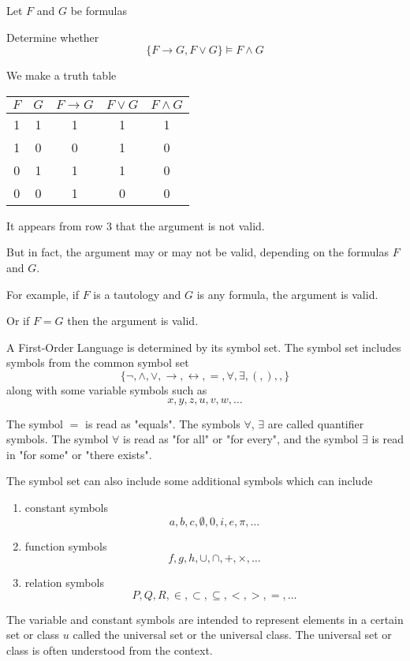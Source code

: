 
\begin{exmp}

Let $F$ and $G$ be formulas 

Determine whether $$\{F\to G, F\vee G\}\vDash F\wedge G$$

\end{exmp}

\begin{solution}
We make a truth table
\begin{center}
\begin{tabular}{c|c|c|c|c}
    $F$ & $G$ & $F\to G$ & $F\vee G$ & $F\wedge G$ \\ \hline
    1 & 1 & 1 & 1 & 1 \\\hline
    1 & 0 & 0 & 1 & 0 \\\hline
    0 & 1 & 1 & 1 & 0 \\\hline
    0 & 0 & 1 & 0 & 0 \\
\end{tabular}
\end{center}

\end{solution}

\begin{rem}

It appears from row 3 that the argument is not valid.

But in fact, the argument may or may not be valid, depending on the formulas $F$ and $G$.

For example, if $F$ is a tautology and $G$ is any formula, the argument is valid.

Or if $F=G$ then the argument is valid.

\end{rem}


\begin{defn}
A First-Order Language is determined by its symbol set. The symbol set includes symbols from the common symbol set $$\{\neg ,\wedge ,\vee ,\to,\leftrightarrow,=,\forall,\exists,(,),,\}$$
along with some variable symbols such as $$x,y,z,u,v,w,\dots$$

The symbol $=$ is read as "equals". The symbols $\forall$, $\exists$ are called quantifier symbols. The symbol $\forall$ is read as "for all" or "for every", and the symbol $\exists$ is read in "for some" or "there exists".

The symbol set can also include some additional symbols which can include 
\begin{enumerate}
\item constant symbols $$a,b,c,\emptyset,0,i,e,\pi,\dots$$
\item function symbols $$f,g,h,\cup,\cap,+,\times,\dots$$
\item relation symbols $$P,Q,R,\in,\subset,\subseteq,<,>,=,\dots$$
\end{enumerate}
\end{defn}
The variable and constant symbols are intended to represent elements in a certain set or class $u$ called the universal set or the universal class. The universal set or class is often understood from the context.


